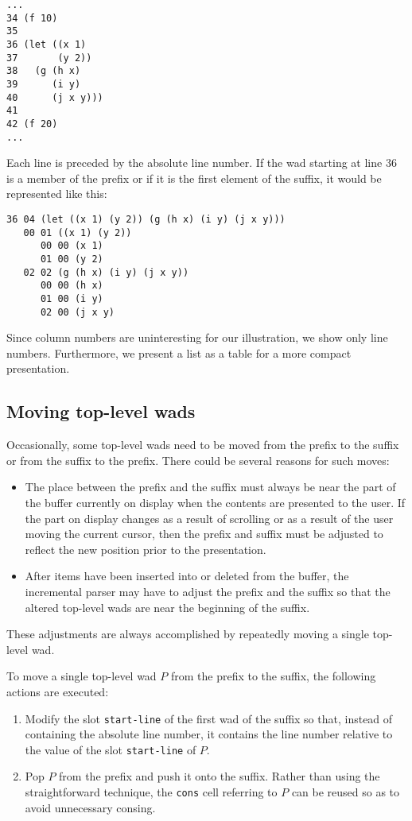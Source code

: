 \begin{verbatim}
...
34 (f 10)
35
36 (let ((x 1)
37       (y 2))
38   (g (h x)
39      (i y)
40      (j x y)))
41
42 (f 20)
...
\end{verbatim}

Each line is preceded by the absolute line number.  If the wad
starting at line 36 is a member of the prefix or if it is the
first element of the suffix, it would be represented like this:

\begin{verbatim}
36 04 (let ((x 1) (y 2)) (g (h x) (i y) (j x y)))
   00 01 ((x 1) (y 2))
      00 00 (x 1)
      01 00 (y 2)
   02 02 (g (h x) (i y) (j x y))
      00 00 (h x)
      01 00 (i y)
      02 00 (j x y)
\end{verbatim}

Since column numbers are uninteresting for our illustration, we
show only line numbers.  Furthermore, we present a list as a table for
a more compact presentation.

\subsection{Moving top-level wads}

Occasionally, some top-level wads need to be moved from the
prefix to the suffix or from the suffix to the prefix.  There could be
several reasons for such moves:

\begin{itemize}
\item The place between the prefix and the suffix must always be near
  the part of the buffer currently on display when the contents are
  presented to the user.  If the part on display changes as a result
  of scrolling or as a result of the user moving the current cursor,
  then the prefix and suffix must be adjusted to reflect the new
  position prior to the presentation.
\item After items have been inserted into or deleted from the buffer,
  the incremental parser may have to adjust the prefix and the suffix
  so that the altered top-level wads are near the beginning
  of the suffix.
\end{itemize}

These adjustments are always accomplished by repeatedly moving a
single top-level wad.

To move a single top-level wad $P$ from the prefix to the
suffix, the following actions are executed:

\begin{enumerate}
\item Modify the slot \texttt{start-line} of the first wad of
  the suffix so that, instead of containing the absolute line number,
  it contains the line number relative to the value of the slot
  \texttt{start-line} of $P$.
\item Pop $P$ from the prefix and push it onto the suffix.  Rather
  than using the straightforward technique, the \texttt{cons} cell
  referring to $P$ can be reused so as to avoid unnecessary consing.
\end{enumerate}

